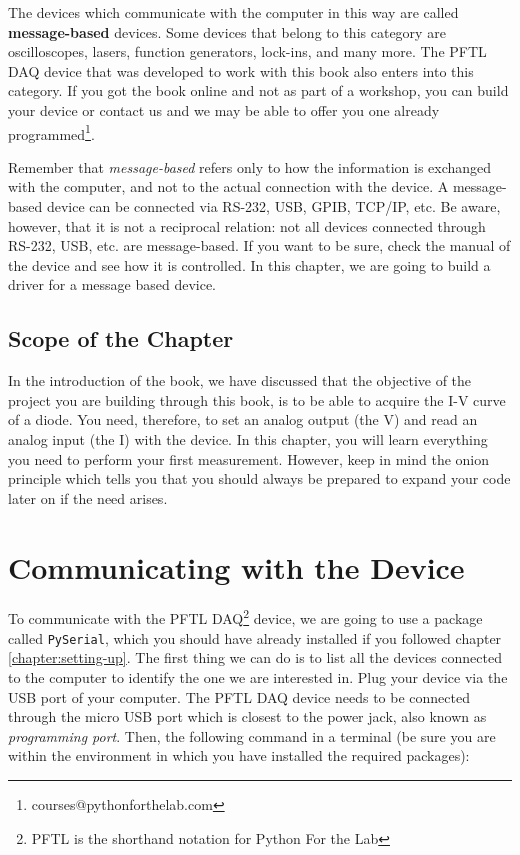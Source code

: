 The devices which communicate with the computer in this way are called \textbf{message-based} devices. Some devices that belong to this category are oscilloscopes, lasers, function generators, lock-ins, and many more. The {PFTL DAQ} device that was developed to work with this book also enters into this category. If you got the book online and not as part of a workshop, you can build your device or contact us and we may be able to offer you one already programmed\footnote{courses@pythonforthelab.com}. 


Remember that \textit{message-based} refers only to how the information is exchanged with the computer, and not to the actual connection with the device. A message-based device can be connected via RS-232, USB, GPIB, TCP/IP, etc. Be aware, however, that it is not a reciprocal relation: not all devices connected through RS-232, USB, etc. are message-based. If you want to be sure, check the manual of the device and see how it is controlled. In this chapter, we are going to build a driver for a message based device.

\subsection{Scope of the Chapter}
In the introduction of the book, we have discussed that the objective of the project you are building through this book, is to be able to acquire the I-V curve of a diode. You need, therefore, to set an analog output (the V) and read an analog input (the I) with the device. In this chapter, you
will learn everything you need to perform your first measurement. However, keep in mind the onion principle which tells you that you should always be prepared to expand your code later on if the need arises.

\section{Communicating with the Device}\label{message-basedevices}
To communicate with the {PFTL DAQ}\footnote{PFTL is the shorthand notation for Python For the Lab} device, we are going to use a package called \texttt{PySerial}, which you should have already installed if you followed chapter \ref{chapter:setting-up}. The first thing we can do is to list all the devices connected to the computer to identify the one we are interested in. Plug your device via the USB port of your computer. The {PFTL DAQ} device needs to be connected through the micro USB port which is closest to the power jack, also known as \emph{programming port}. Then, the following command in a terminal (be sure you are within the environment in which you have installed the required packages):


